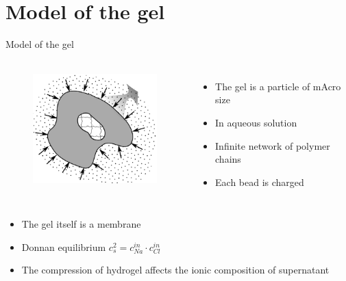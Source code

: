 \documentclass[10pt]{beamer}
\begin{document}
\section[Model]{Model of the gel}
\begin{frame}[fragile]{Model of the gel}
  \begin{columns}[T,onlytextwidth]%
\begin{figure}
\includegraphics[height=4.5cm]{figures/gel_donnan.png}
\end{figure}   
  
  
\begin{itemize}
\item The gel is a particle of mAcro size 
\item In aqueous solution
\item Infinite network of polymer chains
\item Each bead is charged
\end{itemize}


  \end{columns}%
\begin{itemize}
\item The gel itself is a membrane
\item Donnan equilibrium
$c_s^2 = c^{in}_{Na}\cdot c^{in}_{Cl}$
\item The compression of hydrogel  affects the ionic composition of supernatant
\end{itemize}
  
\end{frame}

\end{document}
